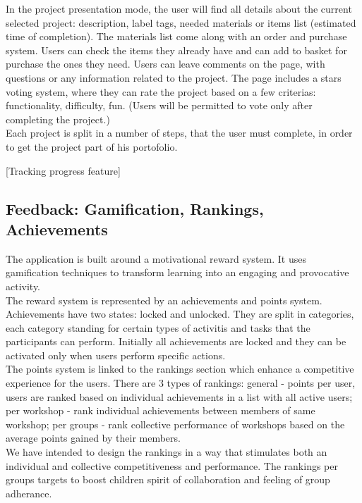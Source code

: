 In the project presentation mode, the user will find all details about the current selected project: description, label tags, needed materials or items list (estimated time of completion). The materials list come along with an order and purchase system. Users can check the items they already have and can add to basket for purchase the ones they need. 
Users can leave comments on the page, with questions or any information related to the project. The page includes a stars voting system, where they can rate the project based on a few criterias: functionality, difficulty, fun. (Users will be permitted to vote only after completing the project.)\\

 Each project is split in a number of steps, that the user must complete, in order to get the project part of his portofolio.

 [Tracking progress feature]


\subsection{Feedback: Gamification, Rankings, Achievements}

The application is built around a motivational reward system. It uses gamification techniques to transform learning into an engaging and provocative activity. \\

The reward system is represented by an achievements and points system. 
Achievements have two states: locked and unlocked. They are split in categories, each category standing for certain types of activitis and tasks that the participants can perform. Initially all achievements are locked and they can be activated only when users perform specific actions.\\

The points system is linked to the rankings section which enhance a competitive experience for the users. 
There are 3 types of rankings: general - points per user, users are ranked based on individual achievements in a list with all active users; per workshop - rank individual achievements between members of same workshop; per groups - rank collective performance of workshops based on the average points gained by their members. \\

We have intended to design the rankings in a way that stimulates both an individual and collective competitiveness and performance. The rankings per groups targets to boost children spirit of collaboration and feeling of group adherance. 

